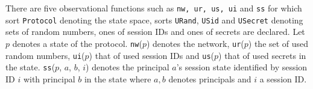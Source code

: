 \documentclass[a4paper,fleqn]{cas-dc}
\begin{document}
There are five observational functions such as \verb!nw, ur, us, ui! and \verb!ss! for which sort
\verb!Protocol! denoting  the  state  space, sorts \verb!URand!, \verb!USid! and \verb!USecret! denoting sets of random numbers, ones of session IDs and ones of secrets are declared.
Let $p$ denotes a state of the protocol. \verb!nw!($p$) denotes the network, \verb!ur!($p$) the set of used random numbers, \verb!ui!($p$) that of used session IDs and \verb!us!($p$) that of used secrets in the state. 
\verb!ss!($p$, $a$, $b$, $i$) denotes the principal $a$’s session state identified by session ID $i$ with principal $b$ in the state where $a, b$ denotes principals and $i$ a session ID.
\end{document}
